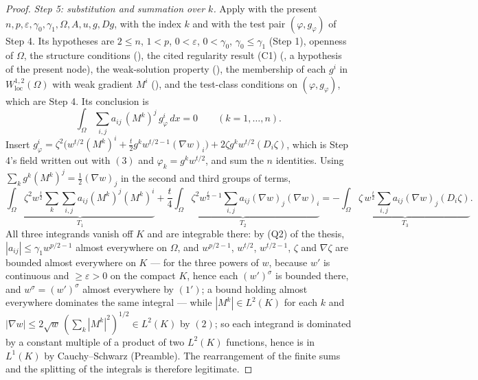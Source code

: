 \begin{proof}
\emph{Step 5: substitution and summation over $k$.}  Apply
 with the present
$n,p,\varepsilon,\gamma_0,\gamma_1,\Omega,A,u,g,Dg$, with the index $k$ and with
the test pair $(\varphi,g_\varphi)$ of Step 4.  Its hypotheses are $2\le n$,
$1<p$, $0<\varepsilon$, $0<\gamma_0$, $\gamma_0\le\gamma_1$ (Step 1), openness of
$\Omega$, the structure conditions (), the cited
regularity result (C1) (, a hypothesis of the
present node), the weak-solution property (), the
membership of each $g^i$ in $W^{1,2}_{\mathrm{loc}}(\Omega)$ with weak gradient
$M^i$ (), and the test-class conditions on
$(\varphi,g_\varphi)$, which are Step 4.  Its conclusion is
\[
\int_\Omega\sum_{i,j}a_{ij}\,(M^k)^j\,g_\varphi^i\,dx=0
\qquad(k=1,\dots,n).
\]
Insert $g_\varphi^i=\zeta^2\bigl(w^{t/2}(M^k)^i+\tfrac t2g^kw^{t/2-1}(\nabla w)_i\bigr)
+2\zeta g^kw^{t/2}(D_i\zeta)$, which is Step 4's field written out with $(3)$ and
$\varphi_k=g^kw^{t/2}$, and sum the $n$ identities.  Using
$\sum_kg^k(M^k)^j=\tfrac12(\nabla w)_j$ in the second and third groups of terms,
\[
\underbrace{\int_\Omega\zeta^2w^{\frac t2}\sum_k\sum_{i,j}a_{ij}(M^k)^j(M^k)^i}_{T_1}
+\underbrace{\frac t4\int_\Omega\zeta^2w^{\frac t2-1}\sum_{i,j}a_{ij}(\nabla w)_j(\nabla w)_i}_{T_2}
=-\underbrace{\int_\Omega\zeta\,w^{\frac t2}\sum_{i,j}a_{ij}(\nabla w)_j(D_i\zeta)}_{T_3}.
\tag{5}
\]
All three integrands vanish off $K$ and are integrable there: by (Q2) of the thesis,
$|a_{ij}|\le\gamma_1w^{p/2-1}$ almost everywhere on $\Omega$, and $w^{p/2-1}$,
$w^{t/2}$, $w^{t/2-1}$, $\zeta$ and $\nabla\zeta$ are bounded almost everywhere
on $K$ --- for the three powers of $w$, because $w'$ is continuous and
$\ge\varepsilon>0$ on the compact $K$, hence each $(w')^\sigma$ is bounded there,
and $w^\sigma=(w')^\sigma$ almost everywhere by $(1')$; a bound holding almost
everywhere dominates the same integral --- while $|M^k|\in L^2(K)$ for each
$k$ and $|\nabla w|\le2\sqrt w\,(\sum_k|M^k|^2)^{1/2}\in L^2(K)$ by $(2)$; so
each integrand is dominated by a constant multiple of a product of two
$L^2(K)$ functions, hence is in $L^1(K)$ by Cauchy--Schwarz (Preamble).  The
rearrangement of the finite sums and the splitting of the integrals is therefore
legitimate.


\end{proof}
